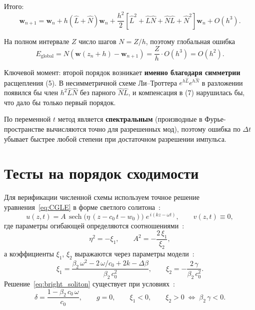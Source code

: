 \documentclass{article}
\begin{document}
Итого:
\begin{equation}
    \mathbf{w}_{n+1} = \mathbf{w}_n + h(\hat L+\hat N)\mathbf{w}_n + \frac{h^2}{2}\left[\hat L^2 + \hat L\hat N + \hat N\hat L + \hat N^2\right]\mathbf{w}_n + O(h^3).
    \tag{7}
\end{equation}

На полном интервале \(Z\) число шагов \(N = Z/h\), поэтому глобальная ошибка
\begin{equation}
    E_{\text{global}} = N (\mathbf{w}(z_n+h) - \mathbf{w}_{n+1}) = \frac{Z}{h}\cdot O(h^3) = O(h^2).
    \tag{9}
\end{equation}

Ключевой момент: второй порядок возникает \textbf{именно благодаря симметрии} расщепления (5). В несимметричной схеме Ли--Троттера \(e^{h\hat L}e^{h\hat N}\) в разложении появился бы член \(h^2\hat L\hat N\) без парного \(\hat N\hat L\), и компенсация в (7) нарушилась бы, что дало бы только первый порядок.

По переменной \(t\) метод является \textbf{спектральным} (производные в Фурье-пространстве вычисляются точно для разрешенных мод),
поэтому ошибка по \(\Delta t\) убывает быстрее любой степени при достаточном разрешении импульса.


\section{Тесты на порядок сходимости}

Для верификации численной схемы используем точное решение уравнения~\eqref{eq:CGLE} в форме светлого солитона~\cite[Eq.~40]{main}:
\begin{equation}\label{eq:bright_soliton}
    u(z, t) = A\,\operatorname{sech}\!\bigl(\eta\,(z - c_0\, t - w_0)\bigr)\;
    e^{\,i(k z - \omega t)},
    \qquad v(z,t) \equiv 0,
\end{equation}
где параметры огибающей определяются соотношениями~\cite[Eq.~39]{main}:
\begin{equation}\label{eq:eta_A}
    \eta^2 = -\xi_1, \qquad A^2 = -\frac{2\,\xi_1}{\xi_2},
\end{equation}
а коэффициенты $\xi_1$, $\xi_2$ выражаются через параметры модели~\cite[Eq.~10]{main}:
\begin{equation}\label{eq:xi}
    \xi_1 = \frac{\beta_2\,\omega^2 - 2\,\omega/c_0 + 2k - \Delta\beta}{\beta_2\,c_0^2},
    \qquad
    \xi_2 = -\frac{2\,\gamma}{\beta_2\,c_0^2}.
\end{equation}
Решение~\eqref{eq:bright_soliton} существует при условиях~\cite[Eq.~7,~41]{main}:
\begin{equation}\label{eq:conditions}
    \delta = \frac{1 - \beta_2\,c_0\,\omega}{c_0}, \qquad
    g = 0, \qquad \xi_1 < 0, \qquad \xi_2 > 0 \;\Leftrightarrow\; \beta_2\,\gamma < 0.
\end{equation}
\end{document}
